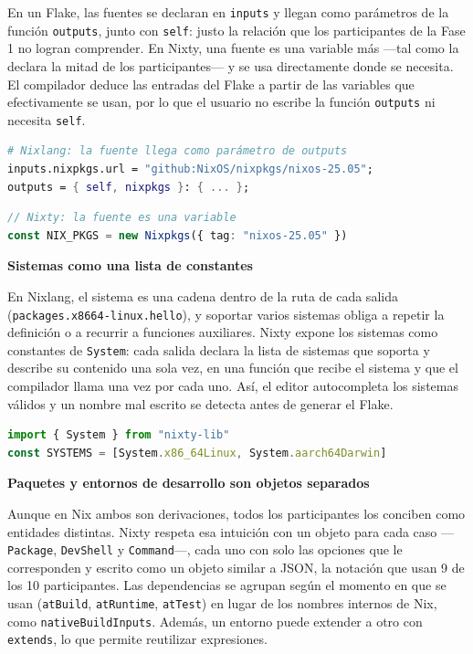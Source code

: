 En un Flake, las fuentes se declaran en \texttt{inputs} y llegan como parámetros de la función \texttt{outputs}, junto con \texttt{self}: justo la relación que los participantes de la Fase 1 no logran comprender. En Nixty, una fuente es una variable más ---tal como la declara la mitad de los participantes--- y se usa directamente donde se necesita. El compilador deduce las entradas del Flake a partir de las variables que efectivamente se usan, por lo que el usuario no escribe la función \texttt{outputs} ni necesita \texttt{self}.

\begin{bloquecodigo}
\begin{lstlisting}[language=nix]
# Nixlang: la fuente llega como parámetro de outputs
inputs.nixpkgs.url = "github:NixOS/nixpkgs/nixos-25.05";
outputs = { self, nixpkgs }: { ... };
\end{lstlisting}
\par\bigskip
\begin{lstlisting}[language=TypeScript]
// Nixty: la fuente es una variable
const NIX_PKGS = new Nixpkgs({ tag: "nixos-25.05" })
\end{lstlisting}
\end{bloquecodigo}

\textbf{Sistemas como una lista de constantes}

En Nixlang, el sistema es una cadena dentro de la ruta de cada salida (\texttt{packages.\allowbreak{}x86\textunderscore{}\allowbreak{}64-\allowbreak{}linux.\allowbreak{}hello}), y soportar varios sistemas obliga a repetir la definición o a recurrir a funciones auxiliares. Nixty expone los sistemas como constantes de \texttt{System}: cada salida declara la lista de sistemas que soporta y describe su contenido una sola vez, en una función que recibe el sistema y que el compilador llama una vez por cada uno. Así, el editor autocompleta los sistemas válidos y un nombre mal escrito se detecta antes de generar el Flake.

\begin{bloquecodigo}
\begin{lstlisting}[language=TypeScript]
import { System } from "nixty-lib"
const SYSTEMS = [System.x86_64Linux, System.aarch64Darwin]
\end{lstlisting}
\end{bloquecodigo}

\textbf{Paquetes y entornos de desarrollo son objetos separados}

Aunque en Nix ambos son derivaciones, todos los participantes los conciben como entidades distintas. Nixty respeta esa intuición con un objeto para cada caso ---\texttt{Package}, \texttt{DevShell} y \texttt{Command}---, cada uno con solo las opciones que le corresponden y escrito como un objeto similar a JSON, la notación que usan 9 de los 10 participantes. Las dependencias se agrupan según el momento en que se usan (\texttt{atBuild}, \texttt{atRuntime}, \texttt{atTest}) en lugar de los nombres internos de Nix, como \texttt{nativeBuildInputs}. Además, un entorno puede extender a otro con \texttt{extends}, lo que permite reutilizar expresiones.

